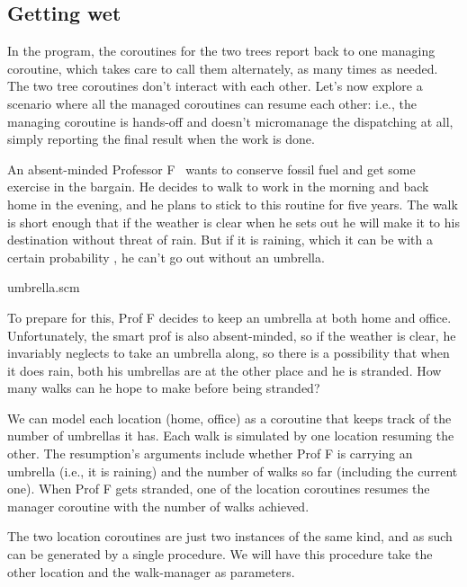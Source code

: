\subsection{Getting wet}

In the  program, the coroutines for the two trees
report back to one managing coroutine, which takes care to call
them alternately, as many times as needed. The two tree
coroutines don't interact with each other. Let’s now explore a
scenario where all the managed coroutines can resume each other:
i.e., the managing coroutine is hands-off and doesn't micromanage
the dispatching at all, simply reporting the final result when
the work is done.

An absent-minded Professor F~\cite{nahin:dice} wants to conserve
fossil fuel and get some exercise in the bargain. He decides to
walk to work in the morning and back home in the evening, and he
plans to stick to this routine for five years. The walk is short
enough that if the weather is clear when he sets out he will make
it to his destination without threat of rain.  But if it is
raining, which it can be with a certain probability
, he can’t go out without an umbrella.

\scmfilename umbrella.scm


\n To prepare for this, Prof F decides to keep an umbrella at
both home and office. Unfortunately, the smart prof is also
absent-minded, so if the weather is clear, he invariably neglects
to take an umbrella along, so there is a possibility that when it
does rain, both his umbrellas are at the other place and he is
stranded. How many walks can he hope to make before being
stranded?

We can model each location (home, office) as a coroutine that
keeps track of the number of umbrellas it has.  Each walk is
simulated by one location resuming the other.  The resumption's
arguments include whether Prof F is carrying an umbrella (i.e.,
it is raining) and the number of walks so far (including the
current one). When Prof F gets stranded, one of the location
coroutines resumes the manager coroutine with the number of walks
achieved.

The two location coroutines are just two instances of the same
kind, and as such can be generated by a single procedure. We will
have this procedure take the other location and the walk-manager
as parameters.

